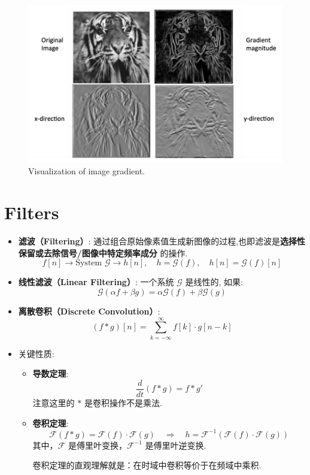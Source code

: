 \begin{figure}[htbp]
    \centering
    \includegraphics[scale=0.3]{figures/VisualizingImageGradient.png}
    \caption{Visualization of image gradient.}
\end{figure}

\clearpage

\section{Filters}
\begin{itemize}
    \item \textbf{滤波（Filtering）}: 通过组合原始像素值生成新图像的过程,也即滤波是\textbf{选择性保留或去除信号/图像中特定频率成分} 的操作.
    $$
    f[n] \rightarrow \text{System } \mathcal{G} \rightarrow h[n], \quad h = \mathcal{G}(f), \quad h[n] = \mathcal{G}(f)[n]
    $$
    \item \textbf{线性滤波（Linear Filtering）}: 一个系统 $ \mathcal{G} $ 是线性的, 如果:
    $$
    \mathcal{G}(\alpha f + \beta g) = \alpha \mathcal{G}(f) + \beta \mathcal{G}(g)
    $$
    \item \textbf{离散卷积（Discrete Convolution）}:
    $$
    (f * g)[n] = \sum_{k=-\infty}^{\infty} f[k] \cdot g[n - k]
    $$
    \item 关键性质:
    \begin{itemize}
        \item \textbf{导数定理}: $$\frac{d}{dt}(f * g) = f * g'$$ 注意这里的 $*$ 是卷积操作不是乘法.
        \item \textbf{卷积定理}: 
        $$
        \mathcal{F}(f * g) = \mathcal{F}(f) \cdot \mathcal{F}(g) \quad \Rightarrow \quad h = \mathcal{F}^{-1}(\mathcal{F}(f) \cdot \mathcal{F}(g))
        $$
        其中，$ \mathcal{F} $ 是傅里叶变换，$ \mathcal{F}^{-1} $ 是傅里叶逆变换.
        
        卷积定理的直观理解就是：在时域中卷积等价于在频域中乘积.

    \end{itemize}
\end{itemize}

